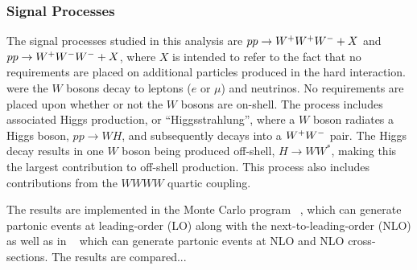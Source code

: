 \subsubsection{Signal Processes}
\label{sec:signal}
The signal processes studied in this analysis 
are  $pp\rightarrow\- W^{+}W^{+}W^{-}+X$ and $pp\rightarrow W^{+}W^{-}W^{-}\allowbreak +X$, 
where $X$ is intended to refer to the fact that
no requirements are placed on additional particles produced in the hard
interaction.
were the $W$ bosons decay to leptons ($e$ or $\mu$) and neutrinos.
No requirements are placed upon whether or not the $W$ bosons are on-shell.
The process includes associated Higgs production, 
or ``Higgsstrahlung'', where a $W$ boson radiates a Higgs boson,
$pp\rightarrow WH$, and subsequently decays into a $W^{+}W^{-}$ pair.
The Higgs decay results in one $W$ boson being produced off-shell,
$H\rightarrow WW^*$, making this the largest contribution to off-shell
production.  This process also includes contributions from 
the $WWWW$ quartic coupling. %


The results are implemented in the Monte
Carlo program \vbfnlo~\cite{Arnold:2011wj,Arnold:2012xn},
which can generate partonic events at leading-order (LO) along with the 
next-to-leading-order (NLO) \xsec 
as well as in \madgraph~\cite{MadGraph} which can generate
partonic events at NLO and NLO cross-sections. The results are compared...






